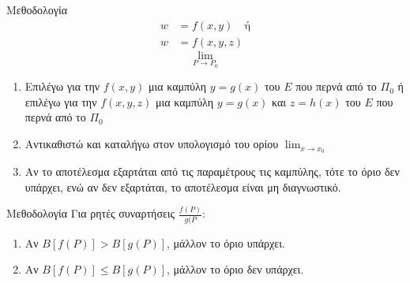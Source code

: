 \documentclass[11pt,a4paper,titlepage,draft]{article}
\begin{document}
\begin{infobox}{Μεθοδολογία}
\begin{align*}
w&=f(x,y) \quad \text{ή}\\
w&=f(x,y,z)
\end{align*}
\[ \lim_{P\to P_0} \]
\begin{enumerate}
\item Επιλέγω για την \(f(x,y)\) μια καμπύλη \(y=g(x)\) του \(Ε\) που περνά από το \(Π_0\) ή \\ επιλέγω για την \(f(x,y,z)\) μια καμπύλη \(y=g(x)\) και \(z=h(x)\) του \(Ε\) που περνά από το \(Π_0\)
\item Αντικαθιστώ και καταλήγω στον υπολογισμό του ορίου \(\lim_{x \to x_0}\)
\item Αν το αποτέλεσμα εξαρτάται από τις παραμέτρους τις καμπύλης, τότε το όριο δεν υπάρχει, ενώ αν δεν εξαρτάται, το αποτέλεσμα είναι μη διαγνωστικό.
\end{enumerate}
\end{infobox}

\begin{infobox}{Μεθοδολογία}
Για ρητές συναρτήσεις \(\frac{f(P)}{g(P}\):
\begin{enumerate}
\item Αν \(B \left[ f(P) \right] > B \left[ g(P) \right]\), μάλλον το όριο υπάρχει.
\item Αν \(B \left[ f(P) \right] \leq B \left[ g(P) \right]\), μάλλον το όριο δεν υπάρχει.
\end{enumerate}
\end{infobox}
\end{document}
